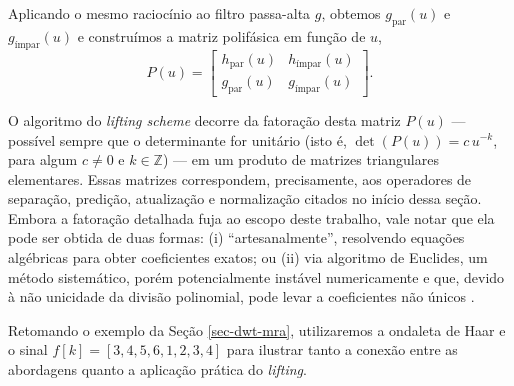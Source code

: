 Aplicando o mesmo raciocínio ao filtro passa-alta \(g\), obtemos \(g_\text{par}(u)\) e \(g_\text{ímpar}(u)\) e construímos a matriz polifásica em função de \(u\),
\begin{equation}
    P(u) = \begin{bmatrix}
    h_\text{par}(u) & h_\text{ímpar}(u) \\
    g_\text{par}(u) & g_\text{ímpar}(u)
    \end{bmatrix}.
    \label{eq:matriz-polifásica}
\end{equation}

O algoritmo do \emph{lifting scheme} decorre da fatoração desta matriz \(P(u)\) --- possível sempre que o determinante for unitário (isto é, \(\det(P(u)) = c\,u^{-k}\), para algum \(c \neq 0\) e \(k \in \mathbb{Z}\)) --- em um produto de matrizes triangulares elementares. 
Essas matrizes correspondem, precisamente, aos operadores de separação, predição, atualização e normalização citados no início dessa seção. 
Embora a fatoração detalhada fuja ao escopo deste trabalho, vale notar que ela pode ser obtida de duas formas: (i) ``artesanalmente'', resolvendo equações algébricas para obter coeficientes exatos; ou (ii) via algoritmo de Euclides, um método sistemático, porém potencialmente instável numericamente e que, devido à não unicidade da divisão polinomial, pode levar a coeficientes não únicos \cite{daubechies_factoring_1998}.

Retomando o exemplo da Seção \ref{sec-dwt-mra}, utilizaremos a ondaleta de Haar e o sinal \(f[k] = [3, 4, 5, 6, 1, 2, 3, 4]\) para ilustrar tanto a conexão entre as abordagens quanto a aplicação prática do \emph{lifting}.

